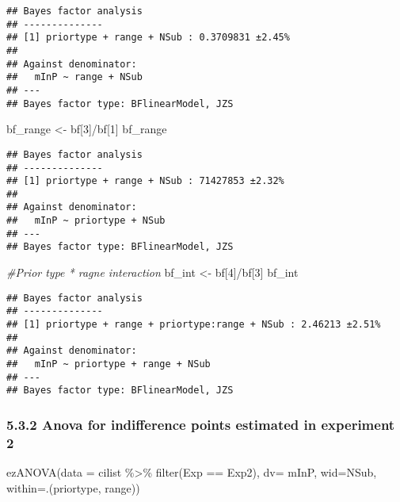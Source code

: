 \documentclass[
]{article}
\newenvironment{Shaded}{\begin{snugshade}}{\end{snugshade}}
\newcommand{\AttributeTok}[1]{\textcolor[rgb]{0.77,0.63,0.00}{#1}}
\newcommand{\CommentTok}[1]{\textcolor[rgb]{0.56,0.35,0.01}{\textit{#1}}}
\newcommand{\DecValTok}[1]{\textcolor[rgb]{0.00,0.00,0.81}{#1}}
\newcommand{\FunctionTok}[1]{\textcolor[rgb]{0.00,0.00,0.00}{#1}}
\newcommand{\NormalTok}[1]{#1}
\newcommand{\OtherTok}[1]{\textcolor[rgb]{0.56,0.35,0.01}{#1}}
\newcommand{\SpecialCharTok}[1]{\textcolor[rgb]{0.00,0.00,0.00}{#1}}
\newcommand{\StringTok}[1]{\textcolor[rgb]{0.31,0.60,0.02}{#1}}
\begin{document}
\begin{verbatim}
## Bayes factor analysis
## --------------
## [1] priortype + range + NSub : 0.3709831 ±2.45%
## 
## Against denominator:
##   mInP ~ range + NSub 
## ---
## Bayes factor type: BFlinearModel, JZS
\end{verbatim}

\begin{Shaded}
\begin{Highlighting}[]
\NormalTok{bf\_range }\OtherTok{\textless{}{-}}\NormalTok{ bf[}\DecValTok{3}\NormalTok{]}\SpecialCharTok{/}\NormalTok{bf[}\DecValTok{1}\NormalTok{]}
\NormalTok{bf\_range}
\end{Highlighting}
\end{Shaded}

\begin{verbatim}
## Bayes factor analysis
## --------------
## [1] priortype + range + NSub : 71427853 ±2.32%
## 
## Against denominator:
##   mInP ~ priortype + NSub 
## ---
## Bayes factor type: BFlinearModel, JZS
\end{verbatim}

\begin{Shaded}
\begin{Highlighting}[]
\CommentTok{\#Prior type * ragne interaction }
\NormalTok{bf\_int }\OtherTok{\textless{}{-}}\NormalTok{ bf[}\DecValTok{4}\NormalTok{]}\SpecialCharTok{/}\NormalTok{bf[}\DecValTok{3}\NormalTok{] }
\NormalTok{bf\_int}
\end{Highlighting}
\end{Shaded}

\begin{verbatim}
## Bayes factor analysis
## --------------
## [1] priortype + range + priortype:range + NSub : 2.46213 ±2.51%
## 
## Against denominator:
##   mInP ~ priortype + range + NSub 
## ---
## Bayes factor type: BFlinearModel, JZS
\end{verbatim}

\hypertarget{anova-for-indifference-points-estimated-in-experiment-2}{%
\subsubsection{5.3.2 Anova for indifference points estimated in
experiment
2}\label{anova-for-indifference-points-estimated-in-experiment-2}}

\begin{Shaded}
\begin{Highlighting}[]
\FunctionTok{ezANOVA}\NormalTok{(}\AttributeTok{data =}\NormalTok{ cilist }\SpecialCharTok{\%\textgreater{}\%} \FunctionTok{filter}\NormalTok{(Exp }\SpecialCharTok{==} \StringTok{\textquotesingle{}Exp2\textquotesingle{}}\NormalTok{), }\AttributeTok{dv=}\NormalTok{ mInP, }\AttributeTok{wid=}\NormalTok{NSub, }\AttributeTok{within=}\NormalTok{.(priortype, range))}
\end{Highlighting}
\end{Shaded}
\end{document}
